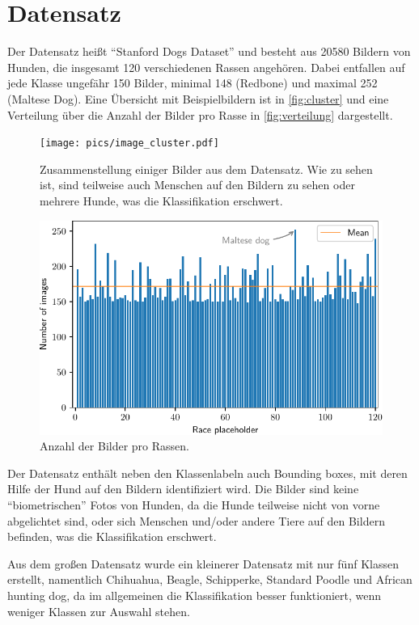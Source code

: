 \chapter{Datensatz}
\label{chap:datensatz}
Der Datensatz heißt \enquote{Stanford Dogs Dataset}\cite{datensatz} und besteht
aus 20580 Bildern von Hunden, die insgesamt 120 verschiedenen Rassen angehören.
Dabei entfallen auf jede Klasse ungefähr 150 Bilder, minimal 148 (Redbone) und
maximal 252 (Maltese Dog). Eine Übersicht mit Beispielbildern ist in
\autoref{fig:cluster} und eine Verteilung über die Anzahl der Bilder pro Rasse
in \autoref{fig:verteilung} dargestellt.

\begin{figure}
  \centering
  \texttt{[image: pics/image\_cluster.pdf]}
  \caption{Zusammenstellung einiger Bilder aus dem Datensatz. Wie zu sehen ist,
  sind teilweise auch Menschen auf den Bildern zu sehen oder mehrere Hunde,
  was die Klassifikation erschwert.}
  \label{fig:cluster}
\end{figure}

\begin{figure}
  \centering
  \includegraphics[scale=0.8]{pics/image_distribution.pdf}
  \caption{Anzahl der Bilder pro Rassen.}
  \label{fig:verteilung}
\end{figure}

Der Datensatz enthält neben den Klassenlabeln auch Bounding boxes, mit deren
Hilfe der Hund auf den Bildern identifiziert wird. Die Bilder sind keine
\enquote{biometrischen} Fotos von Hunden, da die Hunde teilweise nicht von vorne
abgelichtet sind, oder sich Menschen und/oder andere Tiere auf den Bildern
befinden, was die Klassifikation erschwert.

Aus dem großen Datensatz wurde ein kleinerer Datensatz mit nur fünf Klassen
erstellt, namentlich Chihuahua, Beagle, Schipperke, Standard Poodle und African
hunting dog, da im allgemeinen die Klassifikation besser funktioniert, wenn
weniger Klassen zur Auswahl stehen.
